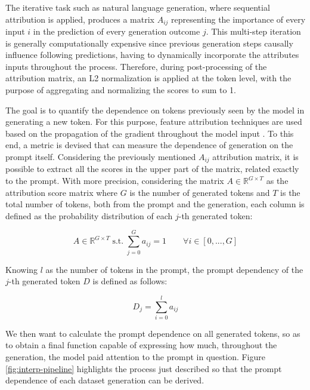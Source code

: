 The iterative task such as natural language generation, where sequential attribution is applied, produces a matrix $A_{ij}$ representing the importance of every input $i$ in the prediction of every generation outcome $j$. This multi-step iteration is generally computationally expensive since previous generation steps causally influence following predictions, having to dynamically incorporate the attributes inputs throughout the process. Therefore, during post-processing of the attribution matrix, an L2 normalization is applied at the token level, with the purpose of aggregating and normalizing the scores to sum to 1.

The goal is to quantify the dependence on tokens previously seen by the model in generating a new token. For this purpose, feature attribution techniques are used based on the propagation of the gradient throughout the model input \citep{simonyan2014deep}. To this end, a metric is devised that can measure the dependence of generation on the prompt itself. Considering the previously mentioned $A_{ij}$ attribution matrix, it is possible to extract all the scores in the upper part of the matrix, related exactly to the prompt. With more precision, considering the matrix $A \in \mathbb{R}^{G \times T} $ as the attribution score matrix where $G$ is the number of generated tokens and $T$ is the total number of tokens, both from the prompt and the generation, each column is defined as the probability distribution of each $j$-th generated token:

\begin{equation*}
    A \in \mathbb{R}^{G \times T} \; \text{s.t.} \; \sum_{j=0}^{G}{a_{ij} = 1} \qquad \forall i \in \left[0,...,G\right]
\end{equation*}

Knowing $l$ as the number of tokens in the prompt, the prompt dependency of the $j$-th generated token $D$ is defined as follows:

\begin{equation*}
    D_j = \sum_{i=0}^{l} a_{ij}
\end{equation*}

We then want to calculate the prompt dependence on all generated tokens, so as to obtain a final function capable of expressing how much, throughout the generation, the model paid attention to the prompt in question. Figure \ref{fig:interp-pipeline} highlights the process just described so that the prompt dependence of each dataset generation can be derived.

